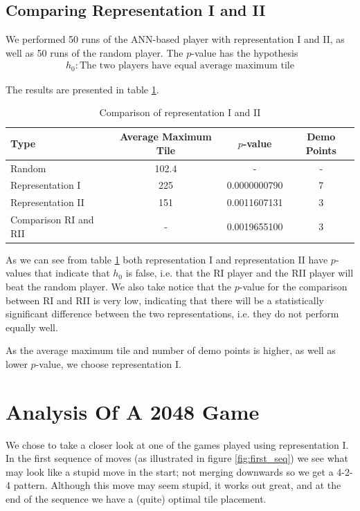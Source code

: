 \documentclass[11pt,a4paper]{article}
\begin{document}
\subsection*{Comparing Representation I and II}
We performed 50 runs of the ANN-based player with representation I and II, as well as 50 runs of the random player. The $p$-value has the hypothesis
\begin{align}
h_0: \textrm{The two players have equal average maximum tile}
\end{align}

The results are presented in table \ref{tab:comparisonRepIandII}.

\begin{table}[h!]
\centering
\caption{Comparison of representation I and II}
\begin{tabular}{lccc}
Type & Average Maximum Tile & $p$-value & Demo Points\\
\hline
Random & 102.4 & - & - \\
Representation I & 225 & 0.0000000790 & 7 \\
Representation II & 151 & 0.0011607131 & 3\\
\hline
Comparison RI and RII & - & 0.0019655100 & 3
\end{tabular}
\label{tab:comparisonRepIandII}
\end{table}

As we can see from table \ref{tab:comparisonRepIandII} both representation I and representation II have $p$-values that indicate that $h_0$ is false, i.e. that the RI player and the RII player will beat the random player. We also take notice that the $p$-value for the comparison between RI and RII is very low, indicating that there will be a statistically significant difference between the two representations, i.e. they do not perform equally well. 

As the average maximum tile and number of demo points is higher, as well as lower $p$-value, we choose representation I.

\section*{Analysis Of A 2048 Game}
We chose to take a closer look at one of the games played using representation I. In the first sequence of moves (as illustrated in figure \ref{fig:first_seq}) we see what may look like a stupid move in the start; not merging downwards so we get a 4-2-4 pattern. Although this move may seem stupid, it works out great, and at the end of the sequence we have a (quite) optimal tile placement.
\end{document}
